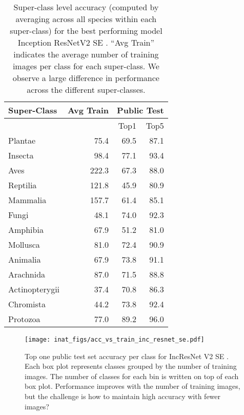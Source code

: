 \documentclass[10pt,twocolumn,letterpaper]{article}
\begin{document}
\begin{table}[t]
\footnotesize
\begin{center}
\begin{tabular}{ |l|r|r|r| }\hline 
{\bf Super-Class} & {\bf Avg Train} & \multicolumn{2}{c|}{\bf Public Test} \\ \hline
& & Top1 &Top5 \\\hline
Plantae    & 75.4 &	69.5 & 87.1 \\
Insecta    & 98.4 &	77.1 & 93.4\\
Aves       & 222.3&	67.3 & 88.0\\
Reptilia   & 121.8& 45.9 & 80.9\\
Mammalia   & 157.7& 61.4  & 85.1 \\
Fungi      & 48.1& 	74.0  & 92.3 \\
Amphibia   & 67.9& 	51.2  & 81.0 \\
Mollusca   & 81.0& 	72.4  & 90.9\\
Animalia   & 67.9 &	73.8  & 91.1\\
Arachnida  & 87.0 &	71.5 & 88.8\\
Actinopterygii & 37.4& 	70.8  & 86.3\\
Chromista      & 44.2& 	73.8  & 92.4\\
Protozoa       & 77.0& 	89.2 &  96.0 \\ \hline
\end{tabular}
\end{center}
\caption{Super-class level accuracy (computed by averaging across all species within each super-class) for the best performing model Inception ResNetV2 SE \cite{hu2017squeeze}. 
``Avg Train'' indicates the average number of training images per class for each super-class. 
We observe a large difference in performance across the different super-classes.
}
\label{tab:sc_acc}
\end{table}

\vspace{-10mm}

\begin{figure}[h!]
\centering
\texttt{[image: inat\_figs/acc\_vs\_train\_inc\_resnet\_se.pdf]}
\caption{Top one public test set accuracy per class for IncResNet V2 SE \cite{hu2017squeeze}.
Each box plot represents classes grouped by the number of training images. 
The number of classes for each bin is written on top of each box plot. Performance improves with the number of training images, but the challenge is how to maintain high accuracy with fewer images?
} 
\label{fig:acc_vs_train}
\vspace{-2mm}
\end{figure}
\end{document}
